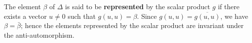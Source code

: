 The element $\beta$ of $\Delta$ is said to be \textbf{represented} by the scalar product $g$ if there exists a vector $u \neq 0$ such that $g(u, u) = \beta$. Since $g(u, u) = \overline{g(u, u)}$, we have $\beta = \bar{\beta}$; hence the elements represented by the scalar product are invariant under the anti-automorphism.
